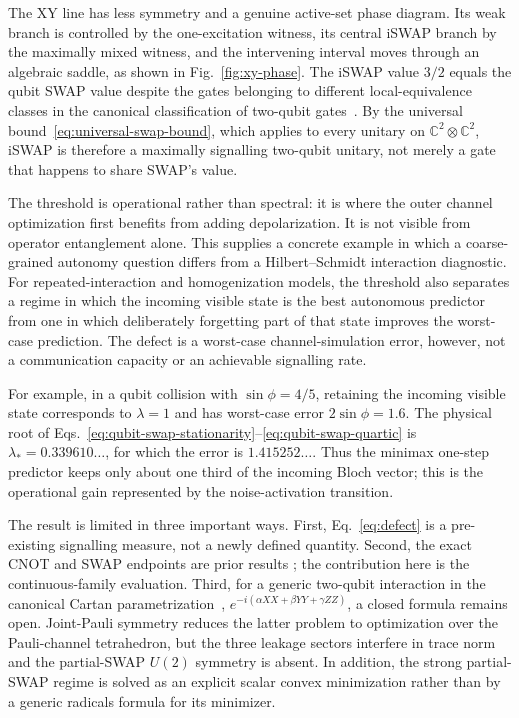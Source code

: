 \documentclass[11pt,a4paper]{article}
\theoremstyle{remark}
\begin{document}
The XY line has less symmetry and a genuine active-set phase diagram.  Its weak
branch is controlled by the one-excitation witness, its central iSWAP branch by
the maximally mixed witness, and the intervening interval moves through an
algebraic saddle, as shown in Fig.~\ref{fig:xy-phase}.  The iSWAP value $3/2$
equals the qubit SWAP value despite the
gates belonging to different local-equivalence classes in the canonical
classification of two-qubit gates~\cite{zhang2003}.  By the universal
bound~\eqref{eq:universal-swap-bound}, which applies to every unitary on
$\mathbb C^2\otimes\mathbb C^2$, iSWAP is therefore a maximally
signalling two-qubit unitary, not merely a gate that happens to share SWAP's
value.

The threshold is operational rather than spectral: it is where the outer
channel optimization first benefits from adding depolarization.  It is not
visible from operator entanglement alone.  This supplies a concrete example in
which a coarse-grained autonomy question differs from a Hilbert--Schmidt
interaction diagnostic.  For repeated-interaction and homogenization models,
the threshold also separates a regime in which the incoming visible state is
the best autonomous predictor from one in which deliberately forgetting part
of that state improves the worst-case prediction.  The defect is a worst-case
channel-simulation error, however, not a communication capacity or an
achievable signalling rate.

For example, in a qubit collision with $\sin\phi=4/5$, retaining the incoming
visible state corresponds to $\lambda=1$ and has worst-case error
$2\sin\phi=1.6$.  The physical root of
Eqs.~\eqref{eq:qubit-swap-stationarity}--\eqref{eq:qubit-swap-quartic} is
$\lambda_*=0.339610\ldots$, for which the error is
$1.415252\ldots$.  Thus the minimax one-step predictor keeps only about one
third of the incoming Bloch vector; this is the operational gain represented
by the noise-activation transition.

The result is limited in three important ways.  First, Eq.~\eqref{eq:defect}
is a pre-existing signalling measure, not a newly defined quantity.  Second,
the exact CNOT and SWAP endpoints are prior results
\cite{barsse2025}; the contribution here is the continuous-family evaluation.
Third, for a generic two-qubit interaction in the canonical Cartan
parametrization~\cite{zhang2003},
$e^{-i(\alpha XX+\beta YY+\gamma ZZ)}$, a closed formula remains open.
Joint-Pauli symmetry
reduces the latter problem to optimization over the Pauli-channel tetrahedron, but
the three leakage sectors interfere in trace norm and the partial-SWAP
$U(2)$ symmetry is absent.
In addition, the strong partial-SWAP regime is solved as an explicit scalar
convex minimization rather than by a generic radicals formula for its
minimizer.
\end{document}
